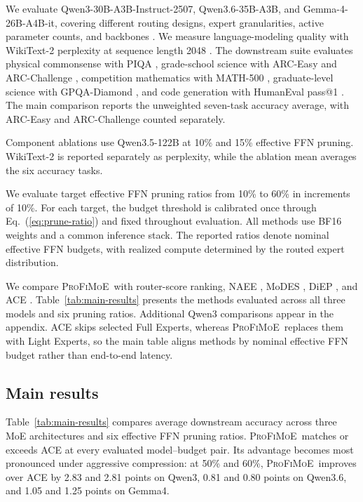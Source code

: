 \documentclass{article}
\newcommand{\method}{\textsc{ProFiMoE}}
\begin{document}
We evaluate Qwen3-30B-A3B-Instruct-2507, Qwen3.6-35B-A3B, and Gemma-4-26B-A4B-it, covering different routing designs, expert granularities, active parameter counts, and backbones \citep{yang2025qwen3,qwenteam2026qwen36,gemmateam2026gemma4}. We measure language-modeling quality with WikiText-2 perplexity at sequence length 2048 \citep{merity2017pointer}. The downstream suite evaluates physical commonsense with PIQA \citep{bisk2020piqa}, grade-school science with ARC-Easy and ARC-Challenge \citep{clark2018arc}, competition mathematics with MATH-500 \citep{hendrycks2021math}, graduate-level science with GPQA-Diamond \citep{rein2023gpqa}, and code generation with HumanEval pass@1 \citep{chen2021evaluating}. The main comparison reports the unweighted seven-task accuracy average, with ARC-Easy and ARC-Challenge counted separately.

Component ablations use Qwen3.5-122B at 10\% and 15\% effective FFN pruning. WikiText-2 is reported separately as perplexity, while the ablation mean averages the six accuracy tasks.

We evaluate target effective FFN pruning ratios from 10\% to 60\% in increments of 10\%. For each target, the budget threshold is calibrated once through Eq.~(\ref{eq:prune-ratio}) and fixed throughout evaluation. All methods use BF16 weights and a common inference stack. The reported ratios denote nominal effective FFN budgets, with realized compute determined by the routed expert distribution.

We compare \method\ with router-score ranking, NAEE \citep{lu2024notall}, MoDES \citep{huang2026modes}, DiEP \citep{bai2025diep}, and ACE \citep{xu2026aceadaptivecalibrationfreeexpert}. Table~\ref{tab:main-results} presents the methods evaluated across all three models and six pruning ratios. Additional Qwen3 comparisons appear in the appendix. ACE skips selected Full Experts, whereas \method\ replaces them with Light Experts, so the main table aligns methods by nominal effective FFN budget rather than end-to-end latency.

\subsection{Main results}



Table~\ref{tab:main-results} compares average downstream accuracy across three MoE architectures and six effective FFN pruning ratios. \method\ matches or exceeds ACE at every evaluated model--budget pair. Its advantage becomes most pronounced under aggressive compression: at 50\% and 60\%, \method\ improves over ACE by 2.83 and 2.81 points on Qwen3, 0.81 and 0.80 points on Qwen3.6, and 1.05 and 1.25 points on Gemma4.
\end{document}
